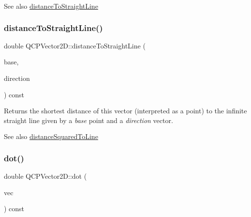 \begin{DoxySeeAlso}{See also}
\mbox{\hyperlink{class_q_c_p_vector2_d_ae240b845c3744e43a5d0aa7b2bb66c19}{distance\+To\+Straight\+Line}} 
\end{DoxySeeAlso}
\mbox{\label{class_q_c_p_vector2_d_ae240b845c3744e43a5d0aa7b2bb66c19}} 
\subsubsection{\texorpdfstring{distanceToStraightLine()}{distanceToStraightLine()}}
{\footnotesize\ttfamily double Q\+C\+P\+Vector2\+D\+::distance\+To\+Straight\+Line (\begin{DoxyParamCaption}\item[{const \mbox{\hyperlink{class_q_c_p_vector2_d}{Q\+C\+P\+Vector2D}} \&}]{base,  }\item[{const \mbox{\hyperlink{class_q_c_p_vector2_d}{Q\+C\+P\+Vector2D}} \&}]{direction }\end{DoxyParamCaption}) const}

Returns the shortest distance of this vector (interpreted as a point) to the infinite straight line given by a {\itshape base} point and a {\itshape direction} vector.

\begin{DoxySeeAlso}{See also}
\mbox{\hyperlink{class_q_c_p_vector2_d_a14840cd3da80cfee4eb3f8977cab89ab}{distance\+Squared\+To\+Line}} 
\end{DoxySeeAlso}
\mbox{\label{class_q_c_p_vector2_d_a39f8d28db7dbffcca6aa63a1f1f6e176}} 
\subsubsection{\texorpdfstring{dot()}{dot()}}
{\footnotesize\ttfamily double Q\+C\+P\+Vector2\+D\+::dot (\begin{DoxyParamCaption}\item[{const \mbox{\hyperlink{class_q_c_p_vector2_d}{Q\+C\+P\+Vector2D}} \&}]{vec }\end{DoxyParamCaption}) const\hspace{0.3cm}{\ttfamily [inline]}}

